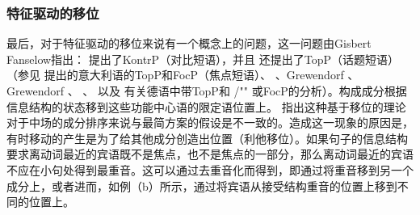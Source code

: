 \subsubsection{特征驱动的移位}
\label{sec-feature-driven-movement}

最后，对于特征驱动的移位来说有一个概念上的问题，这一问题由Gisbert Fanselow指出：\mbox{} \citet[]{Frey2004a}提出了KontrP（对比短语），并且 \citet{Frey2004b-u}还提出了TopP（话题短语）（参见 提出的意大利语的TopP和FocP（焦点短语）、 
 、Grewendorf \citeyearpar[, 240]{Grewendorf2002a}、Grewendorf \citeyearpar{Grewendorf2009a}、 、 以及 有关德语中带TopP和 /"" 或FocP的分析）。构成成分根据信息结构的状态移到这些功能中心语的限定语位置上。 \citet{Fanselow2003b}指出这种基于移位的理论对于中场的成分排序来说与最简方案\indexmp 的假设是不一致的。造成这一现象的原因是，有时移动的产生是为了给其他成分创造出位置（利他移位）。如果句子的信息结构要求离动词最近的宾语既不是焦点，也不是焦点的一部分，那么离动词最近的宾语不应在小句处得到最重音。这可以通过去重音化而得到，即通过将重音移到另一个成分上，或者进而，如例（b）所示，通过将宾语从接受结构重音的位置上移到不同的位置上。
